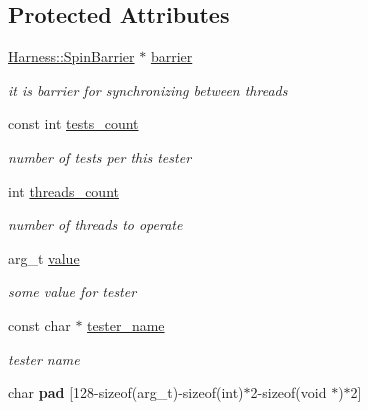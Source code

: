\subsection*{Protected Attributes}
\begin{DoxyCompactItemize}
\item 
\hypertarget{classTesterBase_a4da7e37b63e55de4716d7cd9dce8ce34}{}\hyperlink{classHarness_1_1SpinBarrier}{Harness\+::\+Spin\+Barrier} $\ast$ \hyperlink{classTesterBase_a4da7e37b63e55de4716d7cd9dce8ce34}{barrier}\label{classTesterBase_a4da7e37b63e55de4716d7cd9dce8ce34}

\begin{DoxyCompactList}\small\item\em it is barrier for synchronizing between threads \end{DoxyCompactList}\item 
\hypertarget{classTesterBase_a13fd7dbd72a31cf16945f4b8a347d86c}{}const int \hyperlink{classTesterBase_a13fd7dbd72a31cf16945f4b8a347d86c}{tests\+\_\+count}\label{classTesterBase_a13fd7dbd72a31cf16945f4b8a347d86c}

\begin{DoxyCompactList}\small\item\em number of tests per this tester \end{DoxyCompactList}\item 
\hypertarget{classTesterBase_aac0718877844ec5dac8f8f512067627b}{}int \hyperlink{classTesterBase_aac0718877844ec5dac8f8f512067627b}{threads\+\_\+count}\label{classTesterBase_aac0718877844ec5dac8f8f512067627b}

\begin{DoxyCompactList}\small\item\em number of threads to operate \end{DoxyCompactList}\item 
\hypertarget{classTesterBase_a1f1fa58ae32a2a127ce50e9a5aa021b8}{}arg\+\_\+t \hyperlink{classTesterBase_a1f1fa58ae32a2a127ce50e9a5aa021b8}{value}\label{classTesterBase_a1f1fa58ae32a2a127ce50e9a5aa021b8}

\begin{DoxyCompactList}\small\item\em some value for tester \end{DoxyCompactList}\item 
\hypertarget{classTesterBase_a0ba2f6c047b8ac4555fd3106a08c325a}{}const char $\ast$ \hyperlink{classTesterBase_a0ba2f6c047b8ac4555fd3106a08c325a}{tester\+\_\+name}\label{classTesterBase_a0ba2f6c047b8ac4555fd3106a08c325a}

\begin{DoxyCompactList}\small\item\em tester name \end{DoxyCompactList}\item 
\hypertarget{classTesterBase_a628c30b80de86cb69fb3a44f34ed9adc}{}char {\bfseries pad} \mbox{[}128-\/sizeof(arg\+\_\+t)-\/sizeof(int)$\ast$2-\/sizeof(void $\ast$)$\ast$2\mbox{]}\label{classTesterBase_a628c30b80de86cb69fb3a44f34ed9adc}

\end{DoxyCompactItemize}
